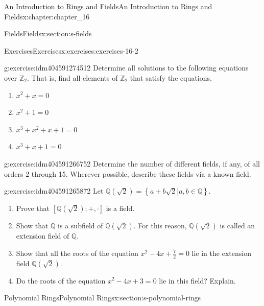 \documentclass[twoside,10pt,]{book}
\numberwithin{equation}{section}
\begin{document}
\begin{chapterptx}{An Introduction to Rings and Fields}{}{An Introduction to Rings and Fields}{}{}{x:chapter:chapter_16}
\begin{sectionptx}{Fields}{}{Fields}{}{}{x:section:s-fields}
\begin{exercises-subsection}{Exercises}{}{Exercises}{}{}{x:exercises:exercises-16-2}
\begin{divisionexercise}{7}{}{}{g:exercise:idm404591274512}%
Determine all solutions to the following equations over \(\mathbb{Z}_2\). That is, find all elements of \(\mathbb{Z}_2\) that satisfy the equations.%
\begin{multicols}{2}
\begin{enumerate}[label=(\alph*)]
\item{}\(x^2 + x = 0\)%
\item{}\(x^2 + 1 = 0\)%
\item{}\(x^3 + x^2 + x + 1 = 0\)%
\item{}\(x^3 + x + 1 = 0\)%
\end{enumerate}
\end{multicols}
%
\end{divisionexercise}%
\begin{divisionexercise}{8}{}{}{g:exercise:idm404591266752}%
Determine the number of different fields, if any, of all orders 2 through 15. Wherever possible, describe these fields via a known field.%
\end{divisionexercise}%
\begin{divisionexercise}{9}{}{}{g:exercise:idm404591265872}%
Let \(\mathbb{Q}\left(\sqrt{2}\right) = \left\{\left.a + b\sqrt{2}\right| a, b \in  \mathbb{Q}\right\}\).%
\begin{enumerate}[label=(\alph*)]
\item{}Prove that \(\left[\mathbb{Q}\left(\sqrt{2}\right); +, \cdot \right]\) is a field.%
\item{}Show that \(\mathbb{Q}\) is a subfield of \(\mathbb{Q}\left(\sqrt{2}\right)\). For this reason, \(\mathbb{Q}\left(\sqrt{2}\right)\) is called an extension field of \(\mathbb{Q}\).%
\item{}Show that all the roots of the equation \(x^2 - 4x+\frac{7}{2} = 0\) lie in the extension field \(\mathbb{Q}\left(\sqrt{2}\right)\).%
\item{}Do the roots of the equation \(x^2 -4 x+ 3 = 0\) lie in this field? Explain.%
\end{enumerate}
%
\end{divisionexercise}%
\end{exercises-subsection}
\end{sectionptx}
%
%
\typeout{************************************************}
\typeout{************************************************}
%
\begin{sectionptx}{Polynomial Rings}{}{Polynomial Rings}{}{}{x:section:s-polynomial-rings}

\end{sectionptx}
\end{chapterptx}
\end{document}
